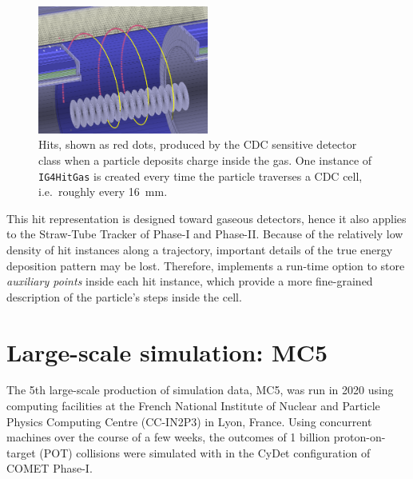 \begin{figure}
    \centering
    \includegraphics[width=0.5\textwidth]{chapter3/hit_instances_blur_crop.png}
    \caption{
        Hits, shown as red dots, produced by the CDC sensitive detector class
        when a particle deposits charge inside the gas. One instance of
        \texttt{IG4HitGas} is created every time the particle traverses a CDC
        cell, i.e.\ roughly every \SI{16}{\mm}.
        }
    \label{fig:sim_cdc_hits}
\end{figure}


This hit representation is designed toward gaseous detectors, hence it
also applies to the Straw-Tube Tracker of Phase-I and Phase-II. Because of the
relatively low density of hit instances along a trajectory, important details of
the true energy deposition pattern may be lost. Therefore, \SimG implements a
run-time option to store \emph{auxiliary points} inside each hit instance, which
provide a more fine-grained description of the particle's steps inside the cell.




\section{Large-scale simulation: MC5}
\label{sec:mc5}
The 5th large-scale production of simulation data, MC5, was run in 2020 using
computing facilities at the French National Institute of Nuclear and Particle
Physics Computing Centre (CC-IN2P3) in Lyon, France. Using 
concurrent machines over the course of a few weeks, the outcomes of 1 billion
proton-on-target (POT) collisions were simulated with \SimG in the CyDet
configuration of COMET Phase-I.

